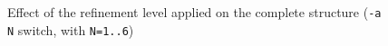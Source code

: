\documentclass[10pt]{article}
\begin{document}
\begin{figure}[htb]
{  \label{f:pieref5}
 }
\centering
 \caption{Effect of the refinement level applied on the complete structure (\texttt{-a N} switch, with \texttt{N=1..6})}
\label{fig:pieref}
\end{figure}
%
\begin{figure}[htb]
\centering
\centering
\centering
\end{figure}
\end{document}
